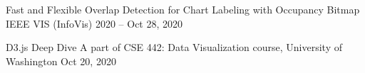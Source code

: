 \begin{cvpubs}
  \cvpub
    {Fast and Flexible Overlap Detection for Chart Labeling with Occupancy Bitmap} %
    {IEEE VIS (InfoVis) 2020  --  \href{https://youtu.be/bi6FfsWV_9k?t=1318}{\underline{}}} %
    {Oct 28, 2020} %
    {} %

  \cvpub
    {D3.js Deep Dive} %
    {A part of CSE 442: Data Visualization course, University of Washington} %
    {Oct 20, 2020} %
    {} %
\end{cvpubs}

